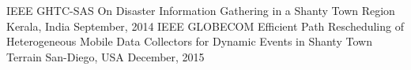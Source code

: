 \begin{cventries}
  \cventry
    {IEEE GHTC-SAS}
    {On Disaster Information Gathering in a Shanty Town Region}
    {Kerala, India}
    {September, 2014}
    {}
  \cventry
  	{IEEE GLOBECOM}
    {Efficient Path Rescheduling of Heterogeneous Mobile Data Collectors for Dynamic Events
in Shanty Town Terrain}
	{San-Diego, USA}
    {December, 2015}
    {}
\end{cventries}
